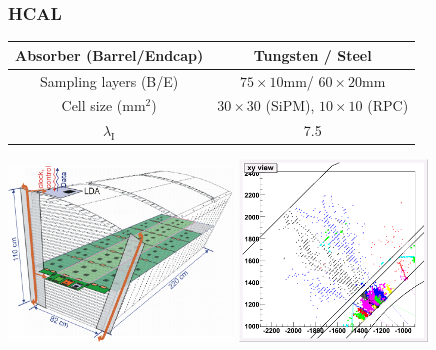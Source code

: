 \documentclass{beamer}
\begin{document}
\begin{frame}
\frametitle{HCAL}
\begin{center}
\begin{tabular}{cc}
\toprule
Absorber (Barrel/Endcap) & Tungsten / Steel \\
\midrule
Sampling layers (B/E) & $75\times10$mm/ $60\times20$mm\\
\midrule
Cell size ($\textrm{mm}^2$) & $30\times30$ (SiPM), $10\times10$ (RPC)\\
\midrule
$\lambda_{\textrm{I}}$ & 7.5\\
\bottomrule
\end{tabular}
\end{center}
\includegraphics[width=6cm]{Fig817a.pdf}
\includegraphics[width=5cm]{hcalzoom.png}
\end{frame}
\end{document}
